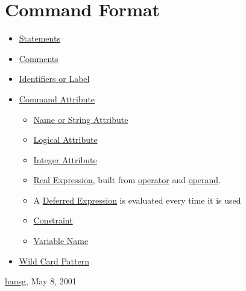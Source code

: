 
\chapter{Command Format}

\begin{itemize}
	\item \href{statement.html}{Statements}
	\item \href{statement.html}{Comments}
	\item \href{label.html}{Identifiers or Label}
	\item \href{attribute.html}{Command Attribute}
\begin{itemize}
	\item \href{name.html}{Name or String Attribute}
	\item \href{logical.html}{Logical Attribute}
	\item \href{integer.html}{Integer Attribute}
	\item \href{expression.html}{Real Expression}, built from \href{expression.html#operator}{operator} and \href{expression.html#operand}{operand}. 
	\item A \href{expression.html#defer}{Deferred Expression} is evaluated every time it is used 
	\item \href{constraint.html}{Constraint}
	\item \href{variable.html}{Variable Name}
\end{itemize}
	\item \href{wildcard.html}{Wild Card Pattern}
\end{itemize}\href{http://www.cern.ch/Hans.Grote/hansg_sign.html}{hansg}, May 8, 2001 














